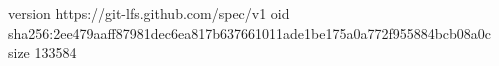 version https://git-lfs.github.com/spec/v1
oid sha256:2ee479aaff87981dec6ea817b637661011ade1be175a0a772f955884bcb08a0c
size 133584
